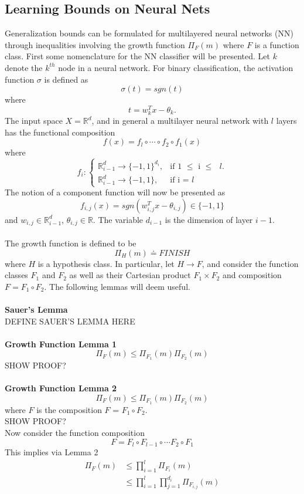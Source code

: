 \documentclass{article} %
\begin{document}
\subsection{Learning Bounds on Neural Nets}
Generalization bounds can be formulated for multilayered neural networks (NN) through inequalities involving the growth function $\Pi_F(m)$ where $F$ is a function class. First some nomenclature for the NN classifier will be presented. Let $k$ denote the $k^{th}$ node in a neural network. For binary classification, the activation function $\sigma$ is defined as
$$
\sigma(t) = sgn(t)
$$
where
$$
t = w_k^Tx - \theta_k.
$$
The input space $X = \mathbb{R}^d$, and in general a multilayer neural network with $l$ layers has the functional composition
$$
f(x) = f_l \circ \cdots \circ f_2 \circ f_1 (x)
$$
where
$$
f_i : \begin{cases}
    \mathbb{R}^d_{i-1} \rightarrow \{-1,1\}^{d_i}, & \text{if 1 $\leq$ i $\leq$ $l$}.\\
    \mathbb{R}^d_{i-1} \rightarrow \{-1,1\}, & \text{if i = $l$}
  \end{cases}
$$
The notion of a component function will now be presented as
$$
f_{i,j}(x) = sgn(w_{i,j}^Tx - \theta_{i,j}) \in \{-1,1\}
$$
and $w_{i,j} \in \mathbb{R}^d_{i-1}$, $\theta_{i,j} \in \mathbb{R}$. The variable $d_{i-1}$ is the dimension of layer $i-1$.
\\
\\
The growth function is defined to be
$$
\Pi_H(m) \doteq FINISH
$$
where $H$ is a hypothesis class. In particular, let $H \rightarrow F$, and consider the function classes $F_1$ and $F_2$ as well as their Cartesian product $F_1 \times F_2$ and composition $F = F_1 \circ F_2$. The following lemmas will deem useful.
\\
\\
\textbf{Sauer's Lemma}
\\
DEFINE SAUER'S LEMMA HERE
\\
\\
\textbf{Growth Function Lemma 1}
$$
\Pi_F(m) \leq \Pi_{F_1}(m)\Pi_{F_2}(m)
$$
SHOW PROOF?
\\
\\
\textbf{Growth Function Lemma 2}
$$
\Pi_F(m) \leq \Pi_{F_1}(m)\Pi_{F_2}(m)
$$
where $F$ is the composition $F$ = $F_1 \circ F_2$.
\\
SHOW PROOF?
\\
Now consider the function composition
$$
F = F_l \circ F_{l-1} \circ \cdots F_2 \circ F_1
$$
This implies via Lemma 2
\begin{align*}
\Pi_F(m) &\leq \prod_{i=1}^l \Pi_{F_i}(m)\\
& \leq \prod_{i=1}^l\prod_{j=1}^{d_i} \Pi_{F_{i,j}}(m)\\
\end{align*}
\end{document}
